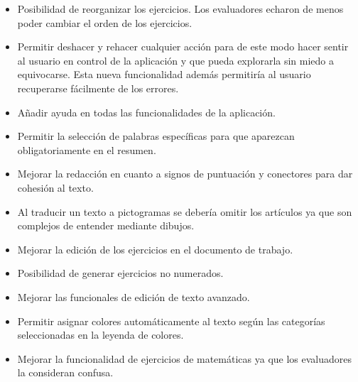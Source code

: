 \begin{itemize}
    \item Posibilidad de reorganizar los ejercicios. Los evaluadores echaron de menos poder cambiar el orden de los ejercicios.
    \item Permitir deshacer y rehacer cualquier acción para de este modo hacer sentir al usuario en control de la aplicación y que pueda explorarla sin miedo a equivocarse. Esta nueva funcionalidad además permitiría al usuario recuperarse fácilmente de los errores.
    \item Añadir ayuda en todas las funcionalidades de la aplicación.
    \item Permitir la selección de palabras específicas para que aparezcan obligatoriamente en el resumen.
    \item Mejorar la redacción en cuanto a signos de puntuación y conectores para dar cohesión al texto.
    \item Al traducir un texto a pictogramas se debería omitir los artículos ya que son complejos de entender mediante dibujos.
    \item Mejorar la edición de los ejercicios en el documento de trabajo.
    \item Posibilidad de generar ejercicios no numerados.
    \item Mejorar las funcionales de edición de texto avanzado.
    \item Permitir asignar colores automáticamente al texto según las categorías seleccionadas en la leyenda de colores.
    \item Mejorar la funcionalidad de ejercicios de matemáticas ya que los evaluadores la consideran confusa.
\end{itemize}